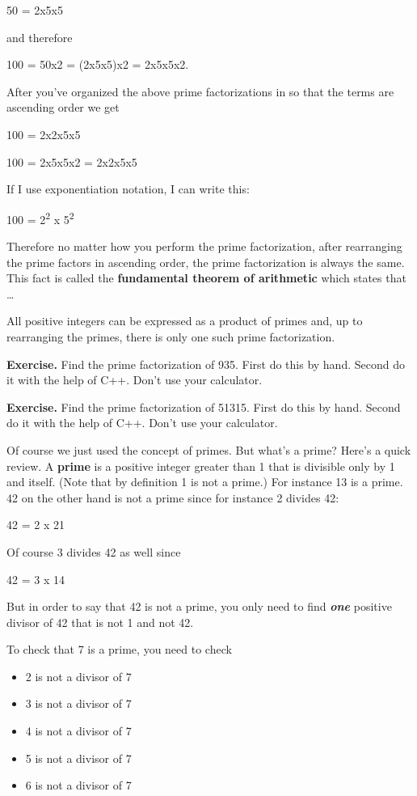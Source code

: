 \documentclass[
]{article}
\providecommand{\tightlist}{%
  \setlength{\itemsep}{0pt}\setlength{\parskip}{0pt}}
\begin{document}
50 = 2x5x5

and therefore

100 = 50x2 = (2x5x5)x2 = 2x5x5x2.

After you've organized the above prime factorizations in so that the
terms are ascending order we get

100 = 2x2x5x5

100 = 2x5x5x2 = 2x2x5x5

If I use exponentiation notation, I can write this:

100 = 2\textsuperscript{2 }x 5\textsuperscript{2}

Therefore no matter how you perform the prime factorization, after
rearranging the prime factors in ascending order, the prime
factorization is always the same. This fact is called the
\textbf{fundamental theorem of arithmetic} which states that \ldots{}

All positive integers can be expressed as a product of primes and, up to
rearranging the primes, there is only one such prime factorization.

\textbf{Exercise.} Find the prime factorization of 935. First do this by
hand. Second do it with the help of C++. Don't use your calculator.

\textbf{Exercise.} Find the prime factorization of 51315. First do this
by hand. Second do it with the help of C++. Don't use your calculator.

Of course we just used the concept of primes. But what's a prime? Here's
a quick review. A \textbf{prime} is a positive integer greater than 1
that is divisible only by 1 and itself. (Note that by definition 1 is
not a prime.) For instance 13 is a prime. 42 on the other hand is not a
prime since for instance 2 divides 42:

42 = 2 x 21

Of course 3 divides 42 as well since

42 = 3 x 14

But in order to say that 42 is not a prime, you only need to find
\emph{\textbf{one}} positive divisor of 42 that is not 1 and not 42.

To check that 7 is a prime, you need to check

\begin{itemize}
\tightlist
\item
  2 is not a divisor of 7
\item
  3 is not a divisor of 7
\item
  4 is not a divisor of 7
\item
  5 is not a divisor of 7
\item
  6 is not a divisor of 7
\end{itemize}
\end{document}
